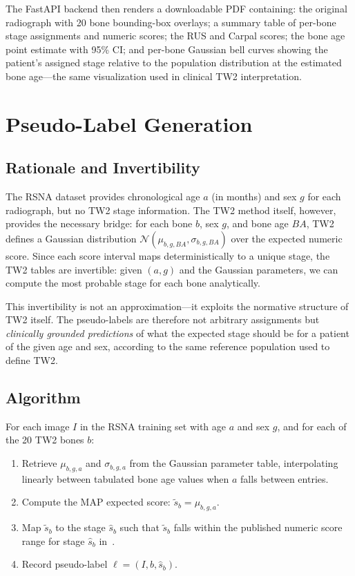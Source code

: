 \documentclass[journal]{IEEEtran}
\begin{document}
The FastAPI backend then renders a downloadable PDF containing:
the original radiograph with 20 bone bounding-box overlays;
a summary table of per-bone stage assignments and numeric scores;
the RUS and Carpal scores; the bone age point estimate with
95\% CI; and per-bone Gaussian bell curves showing the patient's
assigned stage relative to the population distribution at the
estimated bone age—the same visualization used in clinical TW2
interpretation.

\section{Pseudo-Label Generation}
\label{sec:pseudolabels}

\subsection{Rationale and Invertibility}

The RSNA dataset provides chronological age $a$ (in months) and
sex $g$ for each radiograph, but no TW2 stage information.
The TW2 method itself, however, provides the necessary bridge:
for each bone $b$, sex $g$, and bone age $BA$, TW2 defines a
Gaussian distribution $\mathcal{N}(\mu_{b,g,BA}, \sigma_{b,g,BA})$
over the expected numeric score.
Since each score interval maps deterministically to a unique
stage, the TW2 tables are invertible: given $(a, g)$ and the
Gaussian parameters, we can compute the most probable stage for
each bone analytically.

This invertibility is not an approximation—it exploits the
normative structure of TW2 itself.
The pseudo-labels are therefore not arbitrary assignments but
\textit{clinically grounded predictions} of what the expected
stage should be for a patient of the given age and sex,
according to the same reference population used to define TW2.

\subsection{Algorithm}

For each image $I$ in the RSNA training set with age $a$ and
sex $g$, and for each of the 20 TW2 bones $b$:
\begin{enumerate}
  \item Retrieve $\mu_{b,g,a}$ and $\sigma_{b,g,a}$ from the
        Gaussian parameter table, interpolating linearly between
        tabulated bone age values when $a$ falls between entries.
  \item Compute the MAP expected score:
        $\tilde{s}_{b} = \mu_{b,g,a}$.
  \item Map $\tilde{s}_{b}$ to the stage $\hat{s}_b$ such that
        $\tilde{s}_{b}$ falls within the published numeric
        score range for stage $\hat{s}_b$ in~\cite{tanner1983}.
  \item Record pseudo-label $\ell = (I, b, \hat{s}_b)$.
\end{enumerate}
\end{document}
